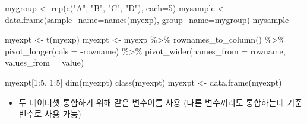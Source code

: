 \documentclass[
]{book}
\newenvironment{Shaded}{\begin{snugshade}}{\end{snugshade}}
\newcommand{\AttributeTok}[1]{\textcolor[rgb]{0.77,0.63,0.00}{#1}}
\newcommand{\DecValTok}[1]{\textcolor[rgb]{0.00,0.00,0.81}{#1}}
\newcommand{\FunctionTok}[1]{\textcolor[rgb]{0.00,0.00,0.00}{#1}}
\newcommand{\NormalTok}[1]{#1}
\newcommand{\OtherTok}[1]{\textcolor[rgb]{0.56,0.35,0.01}{#1}}
\newcommand{\SpecialCharTok}[1]{\textcolor[rgb]{0.00,0.00,0.00}{#1}}
\newcommand{\StringTok}[1]{\textcolor[rgb]{0.31,0.60,0.02}{#1}}
\providecommand{\tightlist}{%
  \setlength{\itemsep}{0pt}\setlength{\parskip}{0pt}}
\begin{document}
\begin{Shaded}
\begin{Highlighting}[]
\NormalTok{mygroup }\OtherTok{\textless{}{-}} \FunctionTok{rep}\NormalTok{(}\FunctionTok{c}\NormalTok{(}\StringTok{"A"}\NormalTok{, }\StringTok{"B"}\NormalTok{, }\StringTok{"C"}\NormalTok{, }\StringTok{"D"}\NormalTok{), }\AttributeTok{each=}\DecValTok{5}\NormalTok{)}
\NormalTok{mysample }\OtherTok{\textless{}{-}} \FunctionTok{data.frame}\NormalTok{(}\AttributeTok{sample\_name=}\FunctionTok{names}\NormalTok{(myexp), }\AttributeTok{group\_name=}\NormalTok{mygroup)}
\NormalTok{mysample}


\NormalTok{myexpt }\OtherTok{\textless{}{-}} \FunctionTok{t}\NormalTok{(myexp)}
\NormalTok{myexpt }\OtherTok{\textless{}{-}}\NormalTok{ myexp }\SpecialCharTok{\%\textgreater{}\%} 
  \FunctionTok{rownames\_to\_column}\NormalTok{() }\SpecialCharTok{\%\textgreater{}\%} 
  \FunctionTok{pivot\_longer}\NormalTok{(}\AttributeTok{cols =} \SpecialCharTok{{-}}\NormalTok{rowname) }\SpecialCharTok{\%\textgreater{}\%} 
  \FunctionTok{pivot\_wider}\NormalTok{(}\AttributeTok{names\_from =}\NormalTok{ rowname, }\AttributeTok{values\_from =}\NormalTok{ value)}



\NormalTok{myexpt[}\DecValTok{1}\SpecialCharTok{:}\DecValTok{5}\NormalTok{, }\DecValTok{1}\SpecialCharTok{:}\DecValTok{5}\NormalTok{]}
\FunctionTok{dim}\NormalTok{(myexpt)}
\FunctionTok{class}\NormalTok{(myexpt)}
\NormalTok{myexpt }\OtherTok{\textless{}{-}} \FunctionTok{data.frame}\NormalTok{(myexpt)}
\end{Highlighting}
\end{Shaded}

\begin{itemize}
\tightlist
\item
  두 데이터셋 통합하기 위해 같은 변수이름 사용 (다른 변수끼리도 통합하는데 기준 변수로 사용 가능)
\end{itemize}
\end{document}
